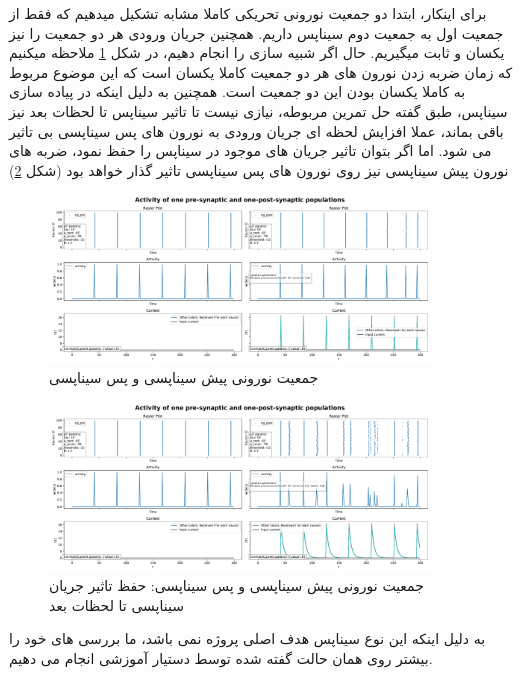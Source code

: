 \documentclass{report}
\begin{document}
        برای اینکار، ابتدا دو جمعیت نورونی تحریکی کاملا مشابه تشکیل میدهیم که فقط از جمعیت اول به جمعیت دوم سیناپس داریم. همچنین جریان ورودی هر دو جمعیت را نیز یکسان و ثابت میگیریم. حال اگر شبیه سازی را انجام دهیم، در شکل
        \ref{fig:part1-two-ng-with-synapse}
        ملاحظه میکنیم که زمان ضربه زدن نورون های هر دو جمعیت کاملا یکسان است که این موضوع مربوط به کاملا یکسان بودن این دو جمعیت است. همچنین به دلیل اینکه در پیاده سازی سیناپس، طبق گفته حل تمرین مربوطه، نیازی نیست تا تاثیر سیناپس تا لحظات بعد نیز باقی بماند، عملا افزایش لحظه ای جریان ورودی به نورون های پس سیناپسی بی تاثیر می شود. اما اگر بتوان تاثیر جریان های موجود در سیناپس را حفظ نمود، ضربه های نورون پیش سیناپسی نیز روی نورون های پس سیناپسی تاثیر گذار خواهد بود
        (شکل \ref{fig:part1-two-ng-with-synapse-decay})
        \begin{figure}[!ht]
            \centering
            \includegraphics[width=0.9\textwidth]{plots/part1-two-ng-with-synapse.pdf} 
            \caption{جمعیت نورونی پیش سیناپسی و پس سیناپسی}
            \label{fig:part1-two-ng-with-synapse}
        \end{figure}
        \begin{figure}[!ht]
            \centering
            \includegraphics[width=0.9\textwidth]{plots/part1-two-ng-with-synapse-decay.pdf} 
            \caption{جمعیت نورونی پیش سیناپسی و پس سیناپسی: حفظ تاثیر جریان سیناپسی تا لحظات بعد}
            \label{fig:part1-two-ng-with-synapse-decay}
        \end{figure}
        به دلیل اینکه این نوع سیناپس هدف اصلی پروژه نمی باشد، ما بررسی های خود را بیشتر روی همان حالت گفته شده توسط دستیار آموزشی انجام می دهیم.
        
\end{document}
